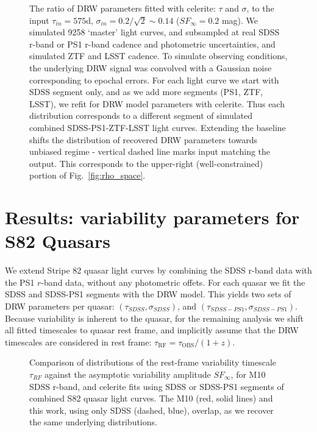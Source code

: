 \documentclass[twocolumn]{aastex62}
\newcommand{\project}[1]{\textsf{#1}}
\begin{document}
\begin{figure*}  %
\caption{The ratio of DRW parameters fitted with \project{celerite}: $\tau$ and $\sigma$, to the input $\tau_{in} = 575 $d, $\sigma_{in} = 0.2 / \sqrt{2} {\sim} 0.14$  ($SF_{\infty}=0.2$ mag). We simulated 9258 `master' light curves, and  subsampled at real SDSS r-band or PS1 r-band cadence and photometric uncertainties, and simulated ZTF and LSST cadence. To simulate observing conditions, the underlying DRW signal was convolved with a Gaussian noise corresponding to epochal errors. 
For each light curve we start with SDSS segment only, and as we add more segments (PS1, ZTF, LSST), we refit for DRW model parameters with \project{celerite}. Thus
each distribution corresponds to a different segment of simulated  combined SDSS-PS1-ZTF-LSST light curves. Extending the baseline shifts the distribution of recovered DRW parameters towards unbiased regime - vertical dashed line marks input matching the output. This corresponds to the upper-right (well-constrained) portion of Fig.~\ref{fig:rho_space}.}
\label{fig:lc_simulated_results}
\end{figure*} 


%
%
%
%
%
%

\section{Results: variability parameters for S82 Quasars}\label{sec:results}

We extend Stripe 82 quasar light curves by combining the SDSS r-band data with  the PS1 $r$-band data, without any photometric offets. For each quasar we fit the SDSS and SDSS-PS1 segments  with the DRW model. This yields two sets of DRW parameters per quasar: $(\tau_{SDSS}, \sigma_{SDSS})$, and $(\tau_{SDSS-PS1},\sigma_{SDSS-PS1})$. Because variability is inherent to the quasar, for the remaining analysis we shift all fitted timescales to quasar rest frame, and implicitly assume that the DRW timescales are considered in rest frame: $\tau_{\mathrm{RF}} = \tau_{\mathrm{OBS}} / (1+z)$.


\begin{figure} %
\caption{Comparison of distributions of the rest-frame variability timescale $\tau_{RF}$ against the  asymptotic variability amplitude $SF_{\infty}$, for M10 SDSS r-band,  and \project{celerite} fits using  SDSS or SDSS-PS1 segments of combined S82 quasar light curves. The M10 (red, solid lines) and this work, using only SDSS (dashed, blue), overlap, as we recover the same underlying distributions. }
\label{fig:tau_sf_dist}
\end{figure} 
\end{document}
